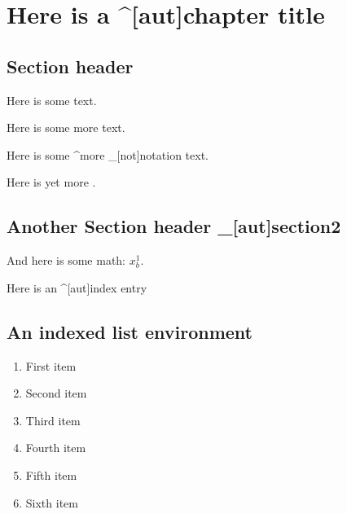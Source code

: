 \documentclass{book}
\def\aindex{\index*[aut]}
\begin{document}
\tableofcontents

\newpage

\chapter{Here is a ^[aut]{chapter} title}

\section{Section header}

Here is some text.

Here is some more 
text.

\newpage

Here is some ^{more} _[not]{notation} text.

Here is yet more \aindex{text}.

\section{Another Section header _[aut]{section2}}

And here is some math: $x^1_b$.

Here is an ^[aut]{index} entry 


\section{An indexed list environment}

\begin{enumerate}

\item
First item

\item
Second item

\item
Third item

\newpage

\item
Fourth item

\item
Fifth item

\item
Sixth item

\end{enumerate}

\printindex[not]


\printindex[list]

\printindex
\end{document}
